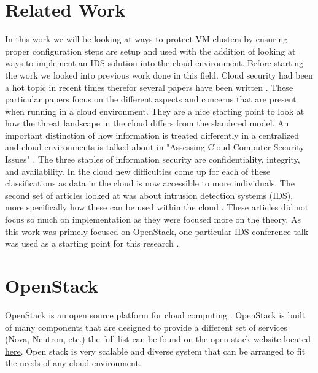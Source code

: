 \documentclass[12pt]{article}
\begin{document}
\section{Related Work}
In this work we will be looking at ways to protect VM clusters by ensuring proper configuration steps are setup and used with the addition of looking at ways to implement an IDS solution into the cloud environment. Before starting the work we looked into previous work done in this field. Cloud security had been a hot topic in recent times therefor several papers have been written \cite{zissis2012addressing, mishra2013cloud, krutz2010cloud}. These particular papers focus on the different aspects and concerns that are present when running in a cloud environment. They are a nice starting point to look at how the threat landscape in the cloud differs from the slandered model. An important distinction of how information is treated differently in a centralized and cloud environments is talked about in "Assessing Cloud Computer Security Issues" \cite{zissis2012addressing}. The three staples of information security are confidentiality, integrity, and availability. In the cloud new difficulties come up for each of these classifications as data in the cloud is now accessible to more individuals.  The second set of articles looked at was about intrusion detection systems (IDS), more specifically how these can be used within the cloud \cite{SurveyOfIDS, patel2013intrusion}. These articles did not focus so much on implementation as they were focused more on the theory. As this work was primely focused on OpenStack, one particular IDS conference talk was used as a starting point for this research \cite{videoPresentation}.


\section{OpenStack}
OpenStack is an open source platform for cloud computing \cite{wiki:OpenStack}. OpenStack is built of many components that are designed to provide a different set of services (Nova, Neutron, etc.) the full list can be found on the open stack website located \href{https://www.openstack.org/software/project-navigator/}{here}. Open stack is very scalable and diverse system that can be arranged to fit the needs of any cloud environment.
\end{document}
